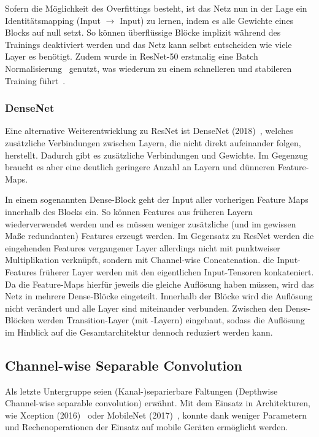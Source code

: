 Sofern die Möglichkeit des Overfittings besteht, ist das Netz nun in der Lage ein Identitätsmapping (Input $\to$ Input) zu lernen, indem es alle Gewichte eines Blocks auf null setzt.
So können überflüssige Blöcke implizit während des Trainings deaktiviert werden und das Netz kann selbst entscheiden wie viele Layer es benötigt.
Zudem wurde in ResNet-50 erstmalig eine Batch Normalisierung~\cite{Ioffe15} genutzt, was wiederum zu einem schnelleren und stabileren Training führt~\cite{Gugger20}.

\subsubsection*{DenseNet}

Eine alternative Weiterentwicklung zu ResNet ist DenseNet (2018)~\cite{Huang18}, welches zusätzliche Verbindungen zwischen Layern, die nicht direkt aufeinander folgen, herstellt.
Dadurch gibt es zusätzliche Verbindungen und Gewichte.
Im Gegenzug braucht es aber eine deutlich geringere Anzahl an Layern und dünneren Feature-Maps.

In einem sogenannten Dense-Block geht der Input aller vorherigen Feature Maps innerhalb des Blocks ein.
So können Features aus früheren Layern wiederverwendet werden und es müssen weniger zusätzliche (und im gewissen Maße redundanten) Features erzeugt werden.
Im Gegensatz zu ResNet werden die eingehenden Features vergangener Layer allerdings nicht mit punktweiser Multiplikation verknüpft, sondern mit \sog Channel-wise Concatenation.
\Dh die Input-Features früherer Layer werden mit den eigentlichen Input-Tensoren konkateniert.
Da die Feature-Maps hierfür jeweils die gleiche Auflösung haben müssen, wird das Netz in mehrere Dense-Blöcke eingeteilt.
Innerhalb der Blöcke wird die Auflösung nicht verändert und alle Layer sind miteinander verbunden.
Zwischen den Dense-Blöcken werden Transition-Layer (\ua mit \pool-Layern) eingebaut, sodass die Auflösung im Hinblick auf die Gesamtarchitektur dennoch reduziert werden kann.

\subsection{Channel-wise Separable Convolution}
\label{subsec:group-conv}

Als letzte Untergruppe seien (Kanal-)separierbare Faltungen (Depthwise \bzw Channel-wise separable convolution) erwähnt.
Mit dem Einsatz in Architekturen, wie Xception (2016)~\cite{Chollet17} oder MobileNet (2017)~\cite{Howard17}, konnte \ua dank weniger Parametern und Rechenoperationen der Einsatz auf mobile Geräten ermöglicht werden.

